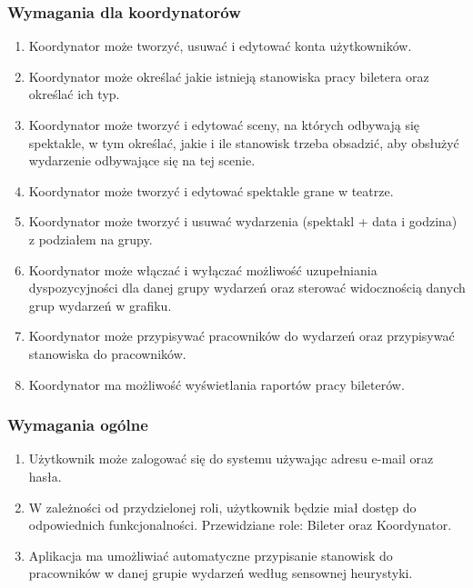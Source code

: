 \documentclass[shortabstract]{iithesis}
\begin{document}
\subsubsection*{Wymagania dla koordynatorów}
\begin{enumerate}
  \item Koordynator może tworzyć, usuwać i edytować konta użytkowników.
  \item Koordynator może określać jakie istnieją stanowiska pracy biletera oraz określać ich typ.
  \item Koordynator może tworzyć i edytować sceny, na których odbywają się spektakle, w tym określać, jakie i ile stanowisk trzeba obsadzić, aby obsłużyć wydarzenie odbywające się na tej scenie.
  \item Koordynator może tworzyć i edytować spektakle grane w teatrze.
  \item Koordynator może tworzyć i usuwać wydarzenia (spektakl + data i godzina) z podziałem na grupy.
  \item Koordynator może włączać i wyłączać możliwość uzupełniania dyspozycyjności dla danej grupy wydarzeń oraz sterować widocznością danych grup wydarzeń w grafiku.
  \item Koordynator może przypisywać pracowników do wydarzeń oraz przypisywać stanowiska do pracowników.
  \item Koordynator ma możliwość wyświetlania raportów pracy bileterów.
\end{enumerate}

\subsubsection*{Wymagania ogólne}
\begin{enumerate}
  \item Użytkownik może zalogować się do systemu używając adresu e-mail oraz hasła.
  \item W zależności od przydzielonej roli, użytkownik będzie miał dostęp do odpowiednich funkcjonalności. Przewidziane role: Bileter oraz Koordynator.
  \item Aplikacja ma umożliwiać automatyczne przypisanie stanowisk do pracowników w danej grupie wydarzeń według sensownej heurystyki.
\end{enumerate}
\end{document}
